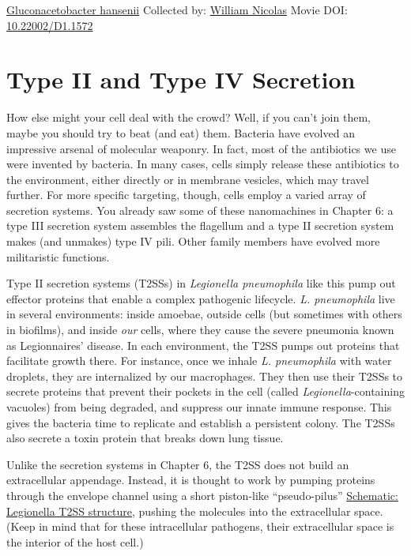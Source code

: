\documentclass[]{tufte-book}
\begin{document}
\hypertarget{htmlwidget-1299a9e05bc258c406e1}{}

\label{fig:9-2}\protect\hyperlink{tree}{Gluconacetobacter hansenii} Collected by: \protect\hyperlink{william_nicolas}{William Nicolas} Movie DOI: \href{https://doi.org/10.22002/D1.1572}{10.22002/D1.1572}

\hypertarget{type-ii-and-type-iv-secretion}{%
\section{Type II and Type IV Secretion}\label{type-ii-and-type-iv-secretion}}

How else might your cell deal with the crowd? Well, if you can't join them, maybe you should try to beat (and eat) them. Bacteria have evolved an impressive arsenal of molecular weaponry. In fact, most of the antibiotics we use were invented by bacteria. In many cases, cells simply release these antibiotics to the environment, either directly or in membrane vesicles, which may travel further. For more specific targeting, though, cells employ a varied array of secretion systems. You already saw some of these nanomachines in Chapter 6: a type III secretion system assembles the flagellum and a type II secretion system makes (and unmakes) type IV pili. Other family members have evolved more militaristic functions.

Type II secretion systems (T2SSs) in \emph{Legionella pneumophila} like this pump out effector proteins that enable a complex pathogenic lifecycle. \emph{L. pneumophila} live in several environments: inside amoebae, outside cells (but sometimes with others in biofilms), and inside \emph{our} cells, where they cause the severe pneumonia known as Legionnaires' disease. In each environment, the T2SS pumps out proteins that facilitate growth there. For instance, once we inhale \emph{L. pneumophila} with water droplets, they are internalized by our macrophages. They then use their T2SSs to secrete proteins that prevent their pockets in the cell (called \emph{Legionella}-containing vacuoles) from being degraded, and suppress our innate immune response. This gives the bacteria time to replicate and establish a persistent colony. The T2SSs also secrete a toxin protein that breaks down lung tissue.

Unlike the secretion systems in Chapter 6, the T2SS does not build an extracellular appendage. Instead, it is thought to work by pumping proteins through the envelope channel using a short piston-like ``pseudo-pilus'' \protect\hyperlink{Legionella_T2SS_structure}{Schematic: Legionella T2SS structure}, pushing the molecules into the extracellular space. (Keep in mind that for these intracellular pathogens, their extracellular space is the interior of the host cell.)
\end{document}
